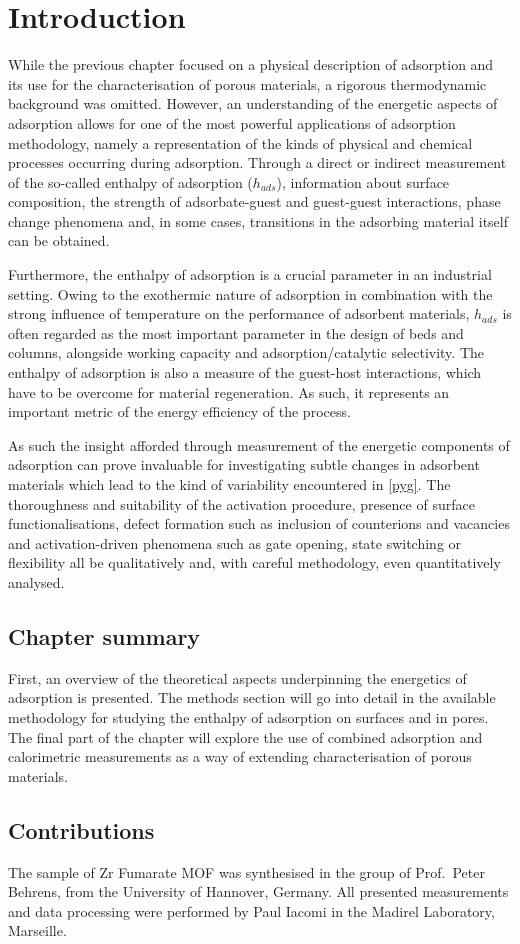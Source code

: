 
\section{Introduction}

While the previous chapter focused on a physical description
of adsorption and its use for the characterisation of 
porous materials, a rigorous thermodynamic background
was omitted. However, an understanding of the energetic
aspects of adsorption allows for one of the most powerful
applications of adsorption methodology, namely a representation
of the kinds of physical and chemical processes occurring 
during adsorption. Through a direct or indirect measurement
of the so-called enthalpy of adsorption (\(h_{ads}\)),
information about surface composition, the strength of 
adsorbate-guest and guest-guest interactions, phase change
phenomena and, in some cases, transitions in the 
adsorbing material itself can be obtained.

Furthermore, the enthalpy of adsorption is a crucial parameter
in an industrial setting. Owing to the exothermic nature of
adsorption in combination with the strong influence of temperature
on the performance of adsorbent materials, \(h_{ads}\) is
often regarded as the most important parameter in the 
design of beds and columns, alongside working capacity and 
adsorption/catalytic selectivity. The enthalpy of adsorption
is also a measure of the guest-host interactions, which
have to be overcome for material regeneration. As such, it 
represents an important metric of the energy efficiency 
of the process.

As such the insight afforded through measurement of 
the energetic components of adsorption can prove invaluable
for investigating subtle changes in adsorbent materials
which lead to the kind of variability encountered in 
\autoref{pyg}. The thoroughness and suitability of the activation
procedure, presence of surface functionalisations, defect 
formation such as inclusion of counterions and vacancies
and activation-driven phenomena such as gate opening,
state switching or flexibility all be qualitatively and,
with careful methodology, even quantitatively analysed.

\subsection*{Chapter summary}

First, an overview of the theoretical aspects underpinning 
the energetics of adsorption is presented. The methods 
section will go into detail in the available methodology
for studying the enthalpy of adsorption on surfaces and in 
pores. The final part of the chapter will explore the use
of combined adsorption and calorimetric measurements
as a way of extending characterisation of porous materials.

\subsection*{Contributions}

The sample of Zr Fumarate MOF was synthesised in the group
of Prof.\ Peter Behrens, from the University of Hannover, 
Germany. All presented measurements and data processing were
performed by Paul Iacomi in the Madirel Laboratory, Marseille.